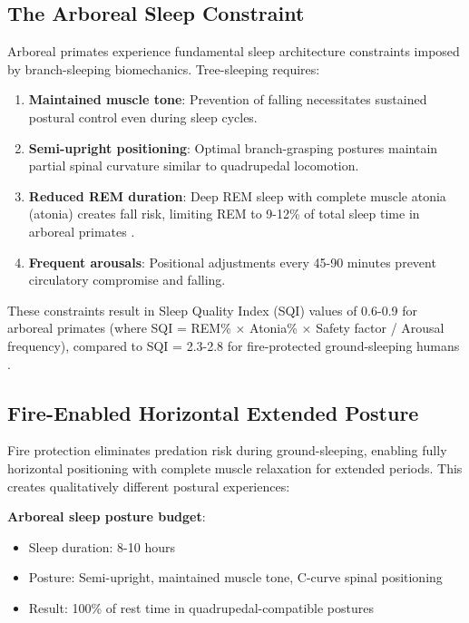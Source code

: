 \subsection{The Arboreal Sleep Constraint}

Arboreal primates experience fundamental sleep architecture constraints imposed by branch-sleeping biomechanics. Tree-sleeping requires:

\begin{enumerate}
\item \textbf{Maintained muscle tone}: Prevention of falling necessitates sustained postural control even during sleep cycles.
\item \textbf{Semi-upright positioning}: Optimal branch-grasping postures maintain partial spinal curvature similar to quadrupedal locomotion.
\item \textbf{Reduced REM duration}: Deep REM sleep with complete muscle atonia (atonia) creates fall risk, limiting REM to 9-12\% of total sleep time in arboreal primates \citep{capellini2008phylogenetic}.
\item \textbf{Frequent arousals}: Positional adjustments every 45-90 minutes prevent circulatory compromise and falling.
\end{enumerate}

These constraints result in Sleep Quality Index (SQI) values of 0.6-0.9 for arboreal primates (where SQI = REM\% $\times$ Atonia\% $\times$ Safety factor / Arousal frequency), compared to SQI = 2.3-2.8 for fire-protected ground-sleeping humans \citep{rattenborg2012sleep}.

\subsection{Fire-Enabled Horizontal Extended Posture}

Fire protection eliminates predation risk during ground-sleeping, enabling fully horizontal positioning with complete muscle relaxation for extended periods. This creates qualitatively different postural experiences:

\textbf{Arboreal sleep posture budget}:
\begin{itemize}
\item Sleep duration: 8-10 hours
\item Posture: Semi-upright, maintained muscle tone, C-curve spinal positioning
\item Result: 100\% of rest time in quadrupedal-compatible postures
\end{itemize}

